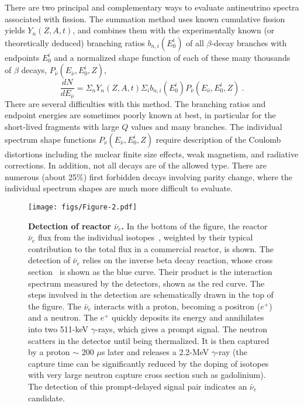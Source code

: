 \documentclass[aps,twocolumn,preprintnumbers,amsmath,superscriptaddress,amssymb,floats,nofootinbib]{revtex4-1}
\begin{document}
There are two principal and complementary ways to evaluate antineutrino spectra associated with fission.
 The summation method uses known cumulative fission yields $Y_n (Z,A,t)$, and combines them
 with the experimentally known (or theoretically deduced) branching ratios $b_{n,i}(E^i_0)$ of all $\beta$-decay branches with endpoints $E^i_0$ and a
 normalized shape function of each of these many thousands of $\beta$ decays, $P_{\bar{\nu}} (E_{\bar{\nu}},E^i_0,Z)$,
 \begin{equation}
 \frac{dN}{dE_{\bar{\nu}}} = \Sigma_n Y_n (Z,A,t) \Sigma_i b_{n,i}(E^i_0) P_{\bar{\nu}} (E_{\bar{\nu}},E^i_0,Z) ~.
 \end{equation}
 There are several difficulties with this method. The branching ratios and endpoint energies are sometimes poorly known at best, in particular for
 the short-lived fragments with large $Q$ values and many branches. The individual spectrum shape functions $P_{\bar{\nu}} (E_{\bar{\nu}},E^i_0,Z)$
 require description of the Coulomb distortions including the nuclear finite size effects, weak magnetism, and radiative corrections. In addition, not all
 decays are of the allowed type. There are numerous (about 25\%) first forbidden decays involving parity change, where the individual spectrum
 shapes are much more difficult to evaluate.

 \begin{figure}[tb]
 \begin{centering}
 \texttt{[image: figs/Figure-2.pdf]}
 \par\end{centering}
 \caption{\label{fig:spectra} {\bf Detection of reactor $\bar{\nu}_e$.} In the bottom of the figure, the reactor $\bar{\nu}_e$ flux from the individual isotopes~\cite{Huber,Mueller}, weighted by their typical contribution to the total flux in a commercial reactor, is shown. The detection of $\bar{\nu}_e$ relies on the inverse beta decay reaction, whose cross section~\cite{VB99, Strumia} is shown as the blue curve. Their product is the interaction spectrum measured by the detectors, shown as the red curve.
 The steps involved in the detection are schematically drawn in the top of the figure. The $\bar{\nu}_e$ interacts with a proton, becoming a positron ($e^+$) and a neutron. The $e^+$ quickly deposits its energy and annihilates into two 511-keV $\gamma$-rays, which gives a prompt signal. The neutron scatters in the detector until being thermalized. It is then captured by a proton $\sim$ 200 $\mu$s later and releases a 2.2-MeV $\gamma$-ray (the capture time can be significantly reduced by the doping of isotopes
with very large neutron capture cross section such as gadolinium). The detection of this prompt-delayed signal pair indicates an $\bar{\nu}_e$ candidate.}
 \end{figure}
\end{document}
